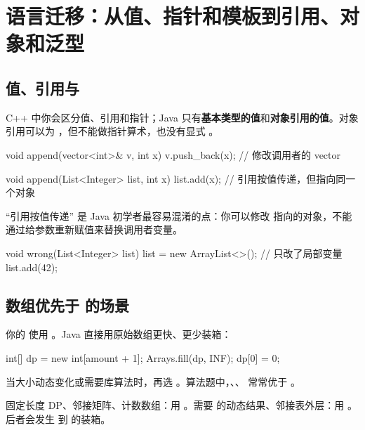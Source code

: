 \chapter{语言迁移：从值、指针和模板到引用、对象和泛型}

\section{值、引用与 }

C++ 中你会区分值、引用和指针；Java 只有\textbf{基本类型的值}和\textbf{对象引用的值}。对象引用可以为 ，但不能做指针算术，也没有显式 。

\begin{cpp}
void append(vector<int>& v, int x) {
    v.push_back(x);       // 修改调用者的 vector
}
\end{cpp}

\begin{javacode}
void append(List<Integer> list, int x) {
    list.add(x);          // 引用按值传递，但指向同一个对象
}
\end{javacode}

``引用按值传递'' 是 Java 初学者最容易混淆的点：你可以修改  指向的对象，不能通过给参数重新赋值来替换调用者变量。

\begin{javacode}
void wrong(List<Integer> list) {
    list = new ArrayList<>();  // 只改了局部变量
    list.add(42);
}
\end{javacode}

\section{数组优先于  的场景}

你的  使用 。Java 直接用原始数组更快、更少装箱：

\begin{javacode}
int[] dp = new int[amount + 1];
Arrays.fill(dp, INF);
dp[0] = 0;
\end{javacode}

当大小动态变化或需要库算法时，再选 。算法题中，、、 常常优于 。

\begin{transfer}
固定长度 DP、邻接矩阵、计数数组：用 。需要  的动态结果、邻接表外层：用 。后者会发生  到  的装箱。
\end{transfer}

